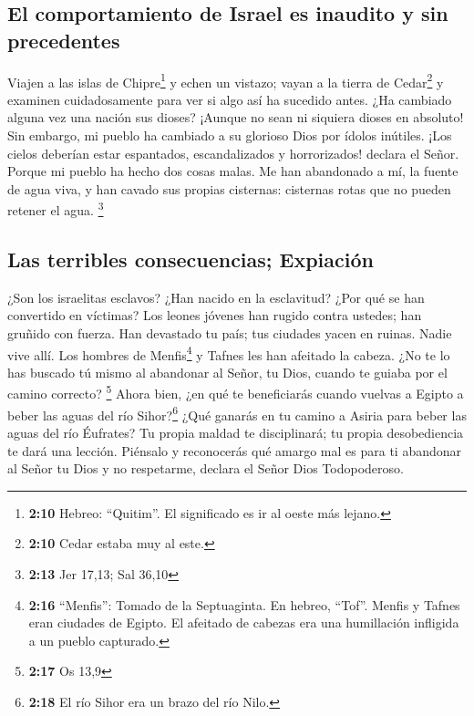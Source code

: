 \hypertarget{el-comportamiento-de-israel-es-inaudito-y-sin-precedentes}{%
\subsection{El comportamiento de Israel es inaudito y sin
precedentes}\label{el-comportamiento-de-israel-es-inaudito-y-sin-precedentes}}

 Viajen a las islas de Chipre\footnote{\textbf{2:10}
  Hebreo: ``Quitim''. El significado es ir al oeste más lejano.} y echen
un vistazo; vayan a la tierra de Cedar\footnote{\textbf{2:10} Cedar
  estaba muy al este.} y examinen cuidadosamente para ver si algo así ha
sucedido antes.  ¿Ha cambiado alguna vez una nación sus
dioses? ¡Aunque no sean ni siquiera dioses en absoluto! Sin embargo, mi
pueblo ha cambiado a su glorioso Dios por ídolos inútiles.
 ¡Los cielos deberían estar espantados, escandalizados y
horrorizados! declara el Señor.  Porque mi pueblo ha
hecho dos cosas malas. Me han abandonado a mí, la fuente de agua viva, y
han cavado sus propias cisternas: cisternas rotas que no pueden retener
el agua. \footnote{\textbf{2:13} Jer 17,13; Sal 36,10}

\hypertarget{las-terribles-consecuencias-expiaciuxf3n}{%
\subsection{Las terribles consecuencias;
Expiación}\label{las-terribles-consecuencias-expiaciuxf3n}}

 ¿Son los israelitas esclavos? ¿Han nacido en la
esclavitud? ¿Por qué se han convertido en víctimas?  Los
leones jóvenes han rugido contra ustedes; han gruñido con fuerza. Han
devastado tu país; tus ciudades yacen en ruinas. Nadie vive allí.
 Los hombres de Menfis\footnote{\textbf{2:16} ``Menfis'':
  Tomado de la Septuaginta. En hebreo, ``Tof''. Menfis y Tafnes eran
  ciudades de Egipto. El afeitado de cabezas era una humillación
  infligida a un pueblo capturado.} y Tafnes les han afeitado la cabeza.
 ¿No te lo has buscado tú mismo al abandonar al Señor, tu
Dios, cuando te guiaba por el camino correcto? \footnote{\textbf{2:17}
  Os 13,9}  Ahora bien, ¿en qué te beneficiarás cuando
vuelvas a Egipto a beber las aguas del río Sihor?\footnote{\textbf{2:18}
  El río Sihor era un brazo del río Nilo.} ¿Qué ganarás en tu camino a
Asiria para beber las aguas del río Éufrates?  Tu propia
maldad te disciplinará; tu propia desobediencia te dará una lección.
Piénsalo y reconocerás qué amargo mal es para ti abandonar al Señor tu
Dios y no respetarme, declara el Señor Dios Todopoderoso.

